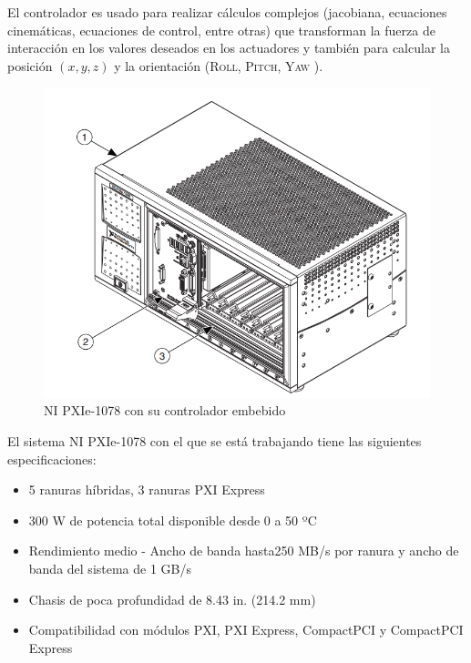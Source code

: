 El controlador es usado para realizar cálculos complejos (jacobiana, ecuaciones cinemáticas, ecuaciones de control, entre otras) que transforman la fuerza de interacción en los valores deseados en los actuadores y también para calcular la posición $(x,y,z)$ y la orientación \textsc{(Roll, Pitch, Yaw )}.




\begin{figure}[htb!]
\centering
\includegraphics[scale=0.4]{FiguresP/pxi2}
\caption{NI PXIe-1078 con su controlador embebido}
\label{fig:pxi_ebedded_controller}
\end{figure}



El sistema NI PXIe-1078 con el que se está trabajando tiene las siguientes especificaciones:
\begin{itemize}
\item 5 ranuras híbridas, 3 ranuras PXI Express
\item 300 W de potencia total disponible desde 0 a 50 ºC
\item Rendimiento medio - Ancho de banda hasta250 MB/s por ranura y ancho de banda del sistema de 1 GB/s
\item Chasis de poca profundidad de 8.43 in. (214.2 mm) 
\item Compatibilidad con módulos PXI, PXI Express, CompactPCI y CompactPCI Express
\end{itemize}






